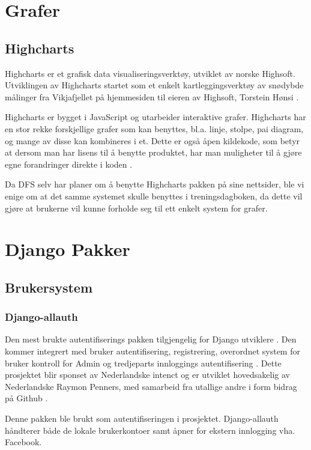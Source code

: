 \section{Grafer}
\subsection{Highcharts}
Highcharts er et grafisk data visualiseringsverktøy, utviklet av norske Highsoft. Utviklingen av Highcharts startet som et enkelt kartleggingsverktøy av snødybde målinger fra Vikjafjellet på hjemmesiden til eieren av Highsoft, Torstein Hønsi \citep{highcharts:info}. 


Highcharts er bygget i JavaScript og utarbeider interaktive grafer. Highcharts har en stor rekke forskjellige grafer som kan benyttes, bl.a.  linje, stolpe, pai diagram, og mange av disse kan kombineres i et. Dette er også åpen kildekode, som betyr at dersom man har lisens til å benytte produktet, har man muligheter til å gjøre egne forandringer direkte i koden \citep{highcharts:chart}. 

Da DFS selv har planer om å benytte Highcharts pakken på sine nettsider, ble vi enige om at det samme systemet skulle benyttes i treningsdagboken, da dette vil gjøre at brukerne vil kunne forholde seg til ett enkelt system for grafer.



\clearpage
\section{Django Pakker}
\subsection{Brukersystem}
\subsubsection*{Django-allauth}
Den mest brukte autentifiserings pakken tilgjengelig for Django utviklere \citep{allauth:package}. Den kommer integrert med bruker autentifisering, registrering, overordnet system for bruker kontroll for Admin og tredjeparts innloggings autentifisering \citep{allauth:git}. Dette prosjektet blir sponset av Nederlandske intenct \citep{allauth:sponsor} og er utviklet hovedsakelig av Nederlandske Raymon Penners, med samarbeid fra utallige andre i form bidrag på Github \citep{allauth:contrib}.

Denne pakken ble brukt som autentifiseringen i prosjektet. Django-allauth håndterer både de lokale brukerkontoer samt åpner for ekstern innlogging vha. Facebook.









